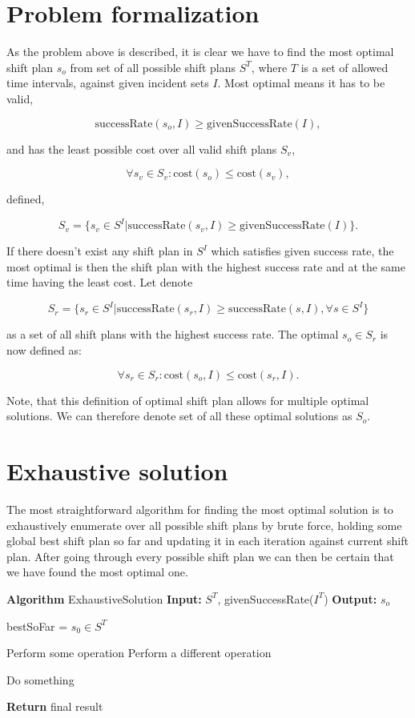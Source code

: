 \section{Problem formalization}
As the problem above is described, it is clear we have to find the most optimal
shift plan $s_o$ from set of all possible shift plans $S^T$, where $T$ is a set
of allowed time intervals, against given incident sets $I$. Most optimal means
it has to be valid,

\[
    \text{successRate}(s_o, I) \geq
    \text{givenSuccessRate}(I),
\]

and has the least possible cost over all valid shift plans $S_v$,

\[
    \forall s_v \in S_v: \text{cost}(s_o) \leq \text{cost}(s_v),
\]

defined,

\[
    S_v = \{ s_v \in S^I | \text{successRate}(s_v, I) \geq \text{givenSuccessRate}(I) \}.
\]

If there doesn't exist any shift plan in $S^I$ which satisfies given success
rate, the most optimal is then the shift plan with the highest success rate and
at the same time having the least cost. Let denote

\[
    S_r = \{s_r \in S^I | \text{successRate}(s_r, I) \geq \text{successRate}(s, I), \forall s \in S^I\}
\]

as a set of all shift plans with the highest success rate. The optimal $s_o \in
    S_r$ is now defined as:

\[
    \forall s_r \in S_r: \text{cost}(s_o, I) \leq \text{cost}(s_r, I).
\]

Note, that this definition of optimal shift plan allows for multiple optimal
solutions. We can therefore denote set of all these optimal solutions as $S_o$.

\section{Exhaustive solution}

The most straightforward algorithm for finding the most optimal solution is to
exhaustively enumerate over all possible shift plans by brute force, holding
some global best shift plan so far and updating it in each iteration against
current shift plan. After going through every possible shift plan we can then
be certain that we have found the most optimal one.

\newpage

\begin{algorithmic}
    \STATE \textbf{Algorithm} ExhaustiveSolution
    \STATE \textbf{Input:} $S^T$, givenSuccessRate($I^T$)
    \STATE \textbf{Output:} $s_o$

    \STATE bestSoFar = $s_0 \in S^T$

    \IF{$$}
    \STATE Perform some operation
    \ELSE
    \STATE Perform a different operation
    \ENDIF
    \ENDFOR

    \STATE Do something
    \ENDWHILE

    \STATE \textbf{Return} final result
\end{algorithmic}